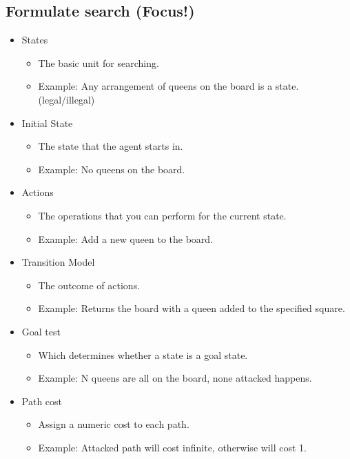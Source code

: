 \documentclass[a4paper, 12pt]{article}
\begin{document}
    \subsection{\textbf{Formulate search (Focus!)}}
        \begin{itemize}
            \item States
                \begin{itemize}
                    \item The basic unit for searching.
                    \item Example: Any arrangement of queens on the board is a state. (legal/illegal)
                \end{itemize}
            \item Initial State
                \begin{itemize}
                    \item The state that the agent starts in.
                    \item Example: No queens on the board.
                \end{itemize}
            \item Actions
                \begin{itemize}
                    \item The operations that you can perform for the current state.
                    \item Example: Add a new queen to the board.
                \end{itemize}
            \item Transition Model
                \begin{itemize}
                    \item The outcome of actions.
                    \item Example: Returns the board with a queen added to the specified square.
                \end{itemize} 
            \item Goal test
                \begin{itemize}
                    \item Which determines whether a state is a goal state.
                    \item Example: N queens are all on the board, none attacked happens.
                \end{itemize} 
            \item Path cost
                \begin{itemize}
                    \item Assign a numeric cost to each path.
                    \item Example: Attacked path will cost infinite, otherwise will cost 1.
                \end{itemize} 
        \end{itemize}    
\end{document}
